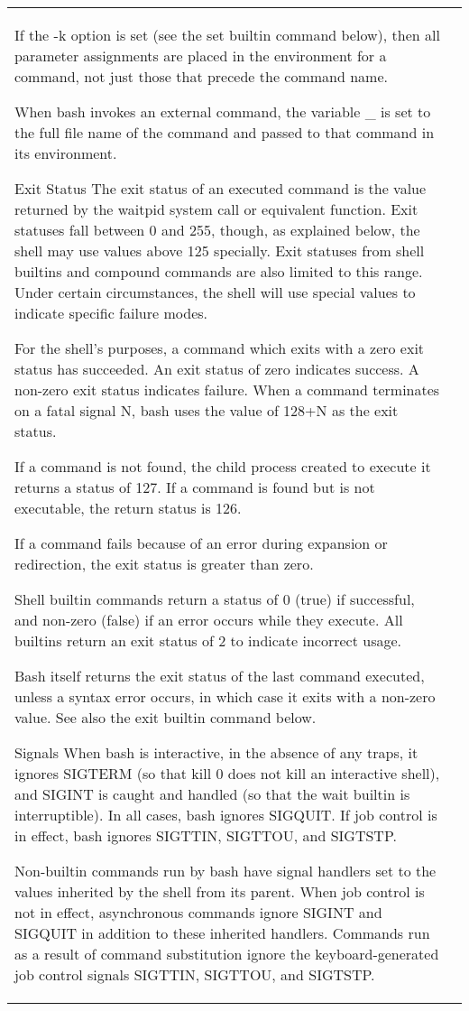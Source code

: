 \documentclass[11pt]{article}
\begin{document}
\begin{longtable}{p{}p{}}
{{{If the -k option is set (see the set builtin command below), then all parameter assignments are placed in the environment for a command, not just those that precede the command name.

When bash invokes an external command, the variable _ is set to the full file name of the command and passed to that command in its environment.

Exit Status
The exit status of an executed command is the value returned by the waitpid system call or equivalent function. Exit statuses fall between 0 and 255, though, as explained below, the shell may use values above 125 specially. Exit statuses from shell builtins and compound commands are also limited to this range. Under certain circumstances, the shell will use special values to indicate specific failure modes.

For the shell's purposes, a command which exits with a zero exit status has succeeded. An exit status of zero indicates success. A non-zero exit status indicates failure. When a command terminates on a fatal signal N, bash uses the value of 128+N as the exit status.

If a command is not found, the child process created to execute it returns a status of 127. If a command is found but is not executable, the return status is 126.

If a command fails because of an error during expansion or redirection, the exit status is greater than zero.

Shell builtin commands return a status of 0 (true) if successful, and non-zero (false) if an error occurs while they execute. All builtins return an exit status of 2 to indicate incorrect usage.

Bash itself returns the exit status of the last command executed, unless a syntax error occurs, in which case it exits with a non-zero value. See also the exit builtin command below.

Signals
When bash is interactive, in the absence of any traps, it ignores SIGTERM (so that kill 0 does not kill an interactive shell), and SIGINT is caught and handled (so that the wait builtin is interruptible). In all cases, bash ignores SIGQUIT. If job control is in effect, bash ignores SIGTTIN, SIGTTOU, and SIGTSTP.

Non-builtin commands run by bash have signal handlers set to the values inherited by the shell from its parent. When job control is not in effect, asynchronous commands ignore SIGINT and SIGQUIT in addition to these inherited handlers. Commands run as a result of command substitution ignore the keyboard-generated job control signals SIGTTIN, SIGTTOU, and SIGTSTP.

}}}
\end{longtable}
\end{document}

